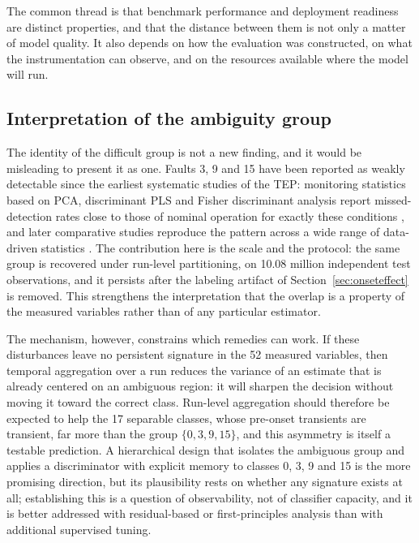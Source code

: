 \documentclass[10pt,twocolumn,a4paper]{article}
\begin{document}
The common thread is that benchmark performance and deployment readiness are
distinct properties, and that the distance between them is not only a matter of
model quality. It also depends on how the evaluation was constructed, on what
the instrumentation can observe, and on the resources available where the model
will run.

\subsection{Interpretation of the ambiguity group}

The identity of the difficult group is not a new finding, and it would be
misleading to present it as one. Faults 3, 9 and 15 have been reported as
weakly detectable since the earliest systematic studies of the TEP: monitoring
statistics based on PCA, discriminant PLS and Fisher discriminant analysis
report missed-detection rates close to those of nominal operation for exactly
these conditions \cite{chiang2001book, chiang2000discriminant}, and later
comparative studies reproduce the pattern across a wide range of data-driven
statistics \cite{yin2012comparison}. The contribution here is the scale and the
protocol: the same group is recovered under run-level partitioning, on 10.08
million independent test observations, and it persists after the labeling
artifact of Section~\ref{sec:onseteffect} is removed. This strengthens the
interpretation that the overlap is a property of the measured variables rather
than of any particular estimator.

The mechanism, however, constrains which remedies can work. If these
disturbances leave no persistent signature in the 52 measured variables, then
temporal aggregation over a run reduces the variance of an estimate that is
already centered on an ambiguous region: it will sharpen the decision without
moving it toward the correct class. Run-level aggregation should therefore be
expected to help the 17 separable classes, whose pre-onset transients are
transient, far more than the group $\{0,3,9,15\}$, and this asymmetry is itself
a testable prediction. A hierarchical design that isolates the ambiguous group
and applies a discriminator with explicit memory to classes 0, 3, 9 and 15 is
the more promising direction, but its plausibility rests on whether any
signature exists at all; establishing this is a question of observability, not
of classifier capacity, and it is better addressed with residual-based or
first-principles analysis than with additional supervised tuning.
\end{document}
